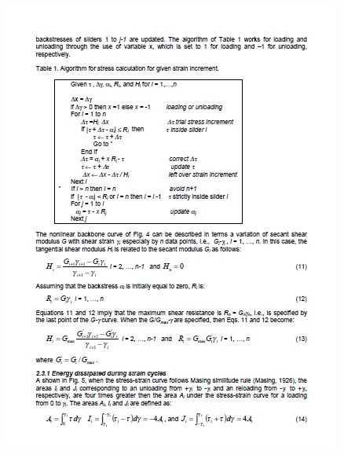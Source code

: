 \documentclass[11pt,a4paper]{report}
\begin{document}
\begin{figure}[h!]
	\centering
	\includegraphics[width=1\linewidth]{"NERA 3"}
	\label{Nera3}
\end{figure}
\end{document}
